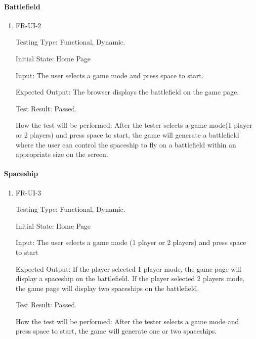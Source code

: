 \documentclass[12pt, titlepage]{article}
\begin{document}
\paragraph{Battlefield}

\begin{enumerate}					
\item{FR-UI-2\\}

Testing Type: Functional, Dynamic.  

Initial State: Home Page

Input: The user selects a game mode and press space to start.

Expected Output: The browser displays the battlefield on the game page.

Test Result: Passed.

How the test will be performed: After the tester selects a game mode(1 player or 2 players) and press space to start, the game will generate a battlefield where the user can control the spaceship to fly on a battlefield within an appropriate size on the screen.
\\
\end{enumerate}

\paragraph{Spaceship}
\begin{enumerate}					
\item{FR-UI-3\\}

Testing Type: Functional, Dynamic.  

Initial State: Home Page

Input: The user selects a game mode (1 player or 2 players) and press space to start

Expected Output: If the player selected 1 player mode, the game page will display a spaceship on the battlefield. If the player selected 2 players mode, the game page will display two spaceships on the battlefield.

Test Result: Passed.

How the test will be performed: After the tester selects a game mode and press space to start, the game will generate one or two spaceships.
\\
\end{enumerate}
\end{document}

